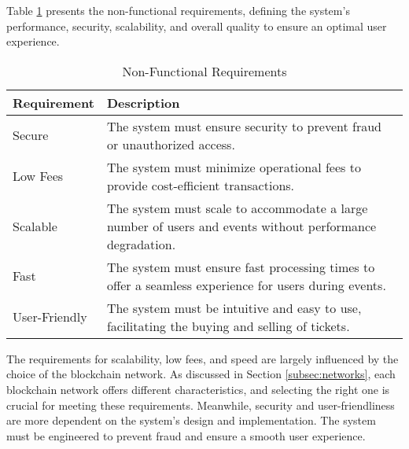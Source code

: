 Table \ref{tab:non_functional_requirements} presents the non-functional
requirements, defining the system's performance, security, scalability, and
overall quality to ensure an optimal user experience.

\begin{table}[H]
    \centering
    \begin{tabularx}{\textwidth}{lX}
        \hline
        \textbf{Requirement} & \textbf{Description}                                                                                     \\
        \hline
        Secure               & The system must ensure security to prevent fraud or unauthorized access.                                 \\
        \hline
        Low Fees             & The system must minimize operational fees to provide cost-efficient transactions.                        \\
        \hline
        Scalable             & The system must scale to accommodate a large number of users and events without performance degradation. \\
        \hline
        Fast                 & The system must ensure fast processing times to offer a seamless experience for users during events.     \\
        \hline
        User-Friendly        & The system must be intuitive and easy to use, facilitating the buying and selling of tickets.            \\
        \hline
    \end{tabularx}
    \caption{Non-Functional Requirements}
    \label{tab:non_functional_requirements}
\end{table}

The requirements for scalability, low fees, and speed are largely influenced by
the choice of the blockchain network. As discussed in Section
\ref{subsec:networks}, each blockchain network offers different
characteristics, and selecting the right one is crucial for meeting these
requirements. Meanwhile, security and user-friendliness are more dependent on
the system's design and implementation. The system must be engineered to
prevent fraud and ensure a smooth user experience.
